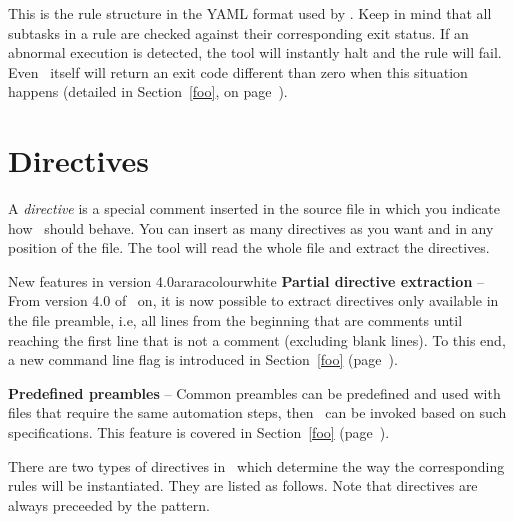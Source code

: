 This is the rule structure in the YAML format used by \arara. Keep in mind that all subtasks in a rule are checked against their corresponding exit status. If an abnormal execution is detected, the tool will instantly halt and the rule will fail. Even \arara\ itself will return an exit code different than zero when this situation happens (detailed in Section~\ref{foo}, on page~\pageref{foo}).

\section{Directives}
\label{sec:directives}

A \emph{directive} is a special comment inserted in the source file in which you indicate how \arara\ should behave. You can insert as many directives as you want and in any position of the file. The tool will read the whole file and extract the directives.

\begin{messagebox}{New features in version 4.0}{araracolour}{\icinfo}{white}
\setlength{\parskip}{1em}
\textbf{Partial directive extraction} -- From version 4.0 of \arara\ on, it is now possible to extract directives only available in the file preamble, i.e, all lines from the beginning that are comments until reaching the first line that is not a comment (excluding blank lines). To this end, a new command line flag is introduced in Section~\ref{foo} (page~\pageref{foo}).

\textbf{Predefined preambles} -- Common preambles can be predefined and used with files that require the same automation steps, then \arara\ can be invoked based on such specifications. This feature is covered in Section~\ref{foo} (page~\pageref{foo}).
\end{messagebox}


There are two types of directives in \arara\ which determine the way the corresponding rules will be instantiated. They are listed as follows. Note that directives are always preceeded by the  pattern.

